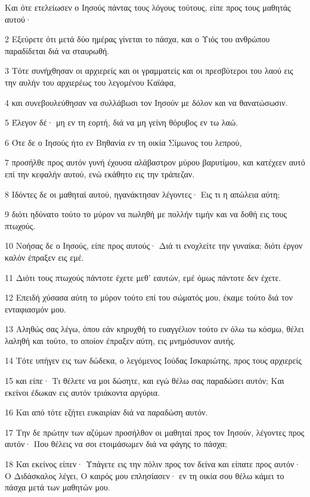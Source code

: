 \par Και ότε ετελείωσεν ο Ιησούς πάντας τους λόγους τούτους, είπε προς τους μαθητάς αυτού·
\par 2 Εξεύρετε ότι μετά δύο ημέρας γίνεται το πάσχα, και ο Υιός του ανθρώπου παραδίδεται διά να σταυρωθή.
\par 3 Τότε συνήχθησαν οι αρχιερείς και οι γραμματείς και οι πρεσβύτεροι του λαού εις την αυλήν του αρχιερέως του λεγομένου Καϊάφα,
\par 4 και συνεβουλεύθησαν να συλλάβωσι τον Ιησούν με δόλον και να θανατώσωσιν.
\par 5 Έλεγον δέ· μη εν τη εορτή, διά να μη γείνη θόρυβος εν τω λαώ.
\par 6 Ότε δε ο Ιησούς ήτο εν Βηθανία εν τη οικία Σίμωνος του λεπρού,
\par 7 προσήλθε προς αυτόν γυνή έχουσα αλάβαστρον μύρου βαρυτίμου, και κατέχεεν αυτό επί την κεφαλήν αυτού, ενώ εκάθητο εις την τράπεζαν.
\par 8 Ιδόντες δε οι μαθηταί αυτού, ηγανάκτησαν λέγοντες· Εις τι η απώλεια αύτη;
\par 9 διότι ηδύνατο τούτο το μύρον να πωληθή με πολλήν τιμήν και να δοθή εις τους πτωχούς.
\par 10 Νοήσας δε ο Ιησούς, είπε προς αυτούς· Διά τι ενοχλείτε την γυναίκα; διότι έργον καλόν έπραξεν εις εμέ.
\par 11 Διότι τους πτωχούς πάντοτε έχετε μεθ' εαυτών, εμέ όμως πάντοτε δεν έχετε.
\par 12 Επειδή χύσασα αύτη το μύρον τούτο επί του σώματός μου, έκαμε τούτο διά τον ενταφιασμόν μου.
\par 13 Αληθώς σας λέγω, όπου εάν κηρυχθή το ευαγγέλιον τούτο εν όλω τω κόσμω, θέλει λαληθή και τούτο, το οποίον έπραξεν αύτη, εις μνημόσυνον αυτής.
\par 14 Τότε υπήγεν εις των δώδεκα, ο λεγόμενος Ιούδας Ισκαριώτης, προς τους αρχιερείς
\par 15 και είπε· Τι θέλετε να μοι δώσητε, και εγώ θέλω σας παραδώσει αυτόν; Και εκείνοι έδωκαν εις αυτόν τριάκοντα αργύρια.
\par 16 Και από τότε εζήτει ευκαιρίαν διά να παραδώση αυτόν.
\par 17 Την δε πρώτην των αζύμων προσήλθον οι μαθηταί προς τον Ιησούν, λέγοντες προς αυτόν· Που θέλεις να σοι ετοιμάσωμεν διά να φάγης το πάσχα;
\par 18 Και εκείνος είπεν· Υπάγετε εις την πόλιν προς τον δείνα και είπατε προς αυτόν· Ο Διδάσκαλος λέγει, Ο καιρός μου επλησίασεν· εν τη οικία σου θέλω κάμει το πάσχα μετά των μαθητών μου.

